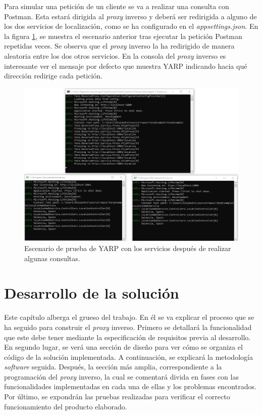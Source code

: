 \documentclass[11pt,spanish,listoffigures]{tfgetsinf}
\begin{document}
Para simular una petición de un cliente se va a realizar una consulta con Postman. Esta estará dirigida al \emph{proxy} inverso y deberá ser redirigida a alguno de los dos servicios de localización, como se ha configurado en el \emph{appsettings.json}. En la figura \ref{ejemploYARP_servicios_funcionando}, se muestra el escenario anterior tras ejecutar la petición Postman repetidas veces. Se observa que el \emph{proxy} inverso la ha redirigido de manera aleatoria entre los dos otros servicios. En la consola del \emph{proxy} inverso es interesante ver el mensaje por defecto que muestra YARP indicando hacia qué dirección redirige cada petición.

\begin{figure}[ht]
\centering
\includegraphics[width=1\textwidth]{imagenes/ejemploYARP/servicios_funcionando}
\caption{Escenario de prueba de YARP con los servicios después de realizar algunas consultas.}
	\label{ejemploYARP_servicios_funcionando}
\end{figure}


\chapter{Desarrollo de la solución}

Este capítulo alberga el grueso del trabajo. En él se va explicar el proceso que se ha seguido para construir el \emph{proxy} inverso. Primero se detallará la funcionalidad que este debe tener mediante la especificación de requisitos previa al desarrollo. En segundo lugar, se verá una sección de diseño para ver cómo se organiza el código de la solución implementada. A continuación, se explicará la metodología \emph{software} seguida. Después, la sección más amplia, correspondiente a la programación del \emph{proxy} inverso, la cual se comentará divida en fases con las funcionalidades implementadas en cada una de ellas y los problemas encontrados. Por último, se expondrán las pruebas realizadas para verificar el correcto funcionamiento del producto elaborado.
\end{document}
